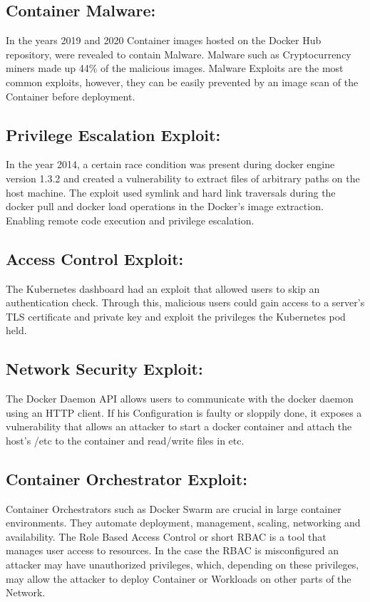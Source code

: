 \documentclass{article}
\begin{document}
\subsection{Container Malware:}
In the years 2019 and 2020 Container images hosted on the Docker Hub repository, 
were revealed to contain Malware. Malware such as Cryptocurrency miners made up 44\% of the malicious images. 
Malware Exploits are the most common exploits, however, they can be easily prevented by 
an image scan of the Container before deployment.

\subsection{Privilege Escalation Exploit:}
In the year 2014, a certain race condition was present during docker engine version 1.3.2 and created a 
vulnerability to extract files of arbitrary paths on the host machine. The exploit used symlink and hard 
link traversals during the docker pull and docker load operations in the Docker's image extraction. 
Enabling remote code execution and privilege escalation.

\subsection{Access Control Exploit:}
The Kubernetes dashboard had an exploit that allowed users to skip an authentication check. 
Through this, malicious users could gain access to a server's TLS certificate and private 
key and exploit the privileges the Kubernetes pod held. 

\subsection{Network Security Exploit:}
The Docker Daemon API allows users to communicate with the docker daemon using an HTTP client. 
If his Configuration is faulty or sloppily done, it exposes a vulnerability that allows an attacker to 
start a docker container and attach the host's /etc to the container and read/write files in etc.
\subsection{Container Orchestrator Exploit:}
Container Orchestrators such as Docker Swarm are crucial in large container environments. 
They automate deployment, management, scaling, networking and availability. 
The Role Based Access Control or short RBAC is a tool that manages user access to resources. 
In the case the RBAC is misconfigured an attacker may have unauthorized privileges, which, 
depending on these privileges, may allow the attacker to deploy Container or Workloads on other parts of the Network.
\end{document}
